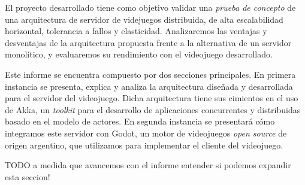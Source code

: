 \noindent El proyecto desarrollado tiene como objetivo validar una \textit{prueba de concepto} de
una arquitectura de servidor de videjuegos distribuida, de alta escalabilidad horizontal,
tolerancia a fallos y elasticidad. Analizaremos las ventajas y desventajas de la arquitectura
propuesta frente a la alternativa de un servidor monolítico, y evaluaremos su rendimiento
con el videojuego desarrollado.
 
Este informe se encuentra compuesto por dos secciones principales. En primera
instancia se presenta, explica y analiza la arquitectura diseñada y desarrollada para el
servidor del videojuego. Dicha arquitectura tiene sus cimientos en el uso de Akka, un 
\textit{toolkit} para el desarrollo de aplicaciones concurrentes y distribuidas basado
en el modelo de actores. En segunda instancia se presentará cómo integramos este servidor
con Godot, un motor de videojuegos \textit{open source} de origen argentino, que utilizamos
para implementar el cliente del videojuego.

TODO a medida que avancemos con el informe entender si podemos expandir esta seccion!
